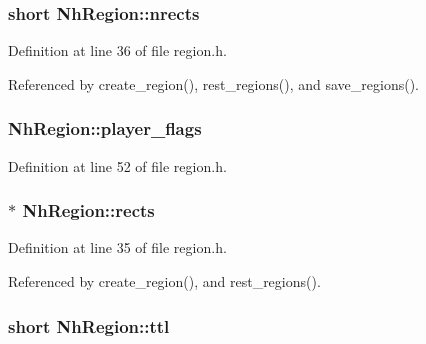 \hypertarget{structNhRegion_a0dd5ab591144d5c85049f3d498191dff}{
\subsubsection[{nrects}]{\setlength{\rightskip}{0pt plus 5cm}short Nh\+Region\+::nrects}}\label{structNhRegion_a0dd5ab591144d5c85049f3d498191dff}


Definition at line 36 of file region.\+h.



Referenced by create\+\_\+region(), rest\+\_\+regions(), and save\+\_\+regions().

\hypertarget{structNhRegion_a640adecacc9ab6c30831b9b35f6c1e5d}{
\subsubsection[{player\+\_\+flags}]{ Nh\+Region\+::player\+\_\+flags}}\label{structNhRegion_a640adecacc9ab6c30831b9b35f6c1e5d}


Definition at line 52 of file region.\+h.

\hypertarget{structNhRegion_a9f1ce44843237df70ccb94ace5c3d06c}{
\subsubsection[{rects}]{$\ast$ Nh\+Region\+::rects}}\label{structNhRegion_a9f1ce44843237df70ccb94ace5c3d06c}


Definition at line 35 of file region.\+h.



Referenced by create\+\_\+region(), and rest\+\_\+regions().

\hypertarget{structNhRegion_aea256aee0ffc4bb6c00199405cf0c775}{
\subsubsection[{ttl}]{\setlength{\rightskip}{0pt plus 5cm}short Nh\+Region\+::ttl}}\label{structNhRegion_aea256aee0ffc4bb6c00199405cf0c775}


